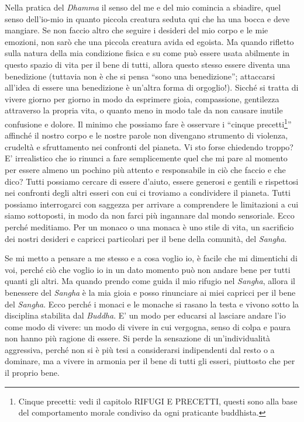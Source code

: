 Nella pratica del \textit{Dhamma} il senso del me e del mio comincia a sbiadire,
quel senso dell'io-mio in quanto piccola creatura seduta qui che ha una
bocca e deve mangiare. Se non faccio altro che seguire i desideri del
mio corpo e le mie emozioni, non sarò che una piccola creatura avida ed
egoista. Ma quando rifletto sulla natura della mia condizione fisica e
su come può essere usata abilmente in questo spazio di vita per il bene
di tutti, allora questo stesso essere diventa una benedizione (tuttavia
non è che si pensa ``sono una benedizione''; attaccarsi all'idea di essere
una benedizione è un'altra forma di orgoglio!). Sicché si tratta di
vivere giorno per giorno in modo da esprimere gioia, compassione,
gentilezza attraverso la propria vita, o quanto meno in modo tale da non
causare inutile confusione e dolore. Il minimo che possiamo fare è
osservare i ``cinque precetti\footnote{Cinque precetti: vedi il capitolo RIFUGI E PRECETTI,
questi sono alla base del comportamento morale condiviso da ogni
praticante buddhista.}'' affinché il nostro corpo e le
nostre parole non divengano strumento di violenza, crudeltà e
sfruttamento nei confronti del pianeta. Vi sto forse chiedendo troppo?
E' irrealistico che io rinunci a fare semplicemente quel che mi pare al
momento per essere almeno un pochino più attento e responsabile in ciò
che faccio e che dico? Tutti possiamo cercare di essere d'aiuto, essere
generosi e gentili e rispettosi nei confronti degli altri esseri con cui
ci troviamo a condividere il pianeta. Tutti possiamo interrogarci con
saggezza per arrivare a comprendere le limitazioni a cui siamo
sottoposti, in modo da non farci più ingannare dal mondo sensoriale.
Ecco perché meditiamo. Per un monaco o una monaca è uno stile di vita,
un sacrificio dei nostri desideri e capricci particolari per il bene
della comunità, del \textit{Sangha}.

Se mi metto a pensare a me stesso e a cosa voglio io, è facile che mi
dimentichi di voi, perché ciò che voglio io in un dato momento può non
andare bene per tutti quanti gli altri. Ma quando prendo come guida il
mio rifugio nel \textit{Sangha}, allora il benessere del \textit{Sangha} è la mia gioia e
posso rinunciare ai miei capricci per il bene del \textit{Sangha}. Ecco perché i
monaci e le monache si rasano la testa e vivono sotto la disciplina
stabilita dal \textit{Buddha}. E' un modo per educarsi al lasciare andare l'io
come modo di vivere: un modo di vivere in cui vergogna, senso di colpa e
paura non hanno più ragione di essere. Si perde la sensazione di
un'individualità aggressiva, perché non si è più tesi a considerarsi
indipendenti dal resto o a dominare, ma a vivere in armonia per il bene
di tutti gli esseri, piuttosto che per il proprio bene.

